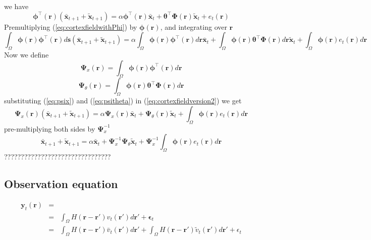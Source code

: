 \documentclass[onecolumn,draftcls]{IEEEtran}
\begin{document}
we have
\begin{equation}
 \boldsymbol \phi^{\top}(\mathbf r)(\bar{\mathbf x}_{t+1}+\tilde{\mathbf x}_{t+1})=\alpha \boldsymbol\phi^{\top}(\mathbf r)\bar{\mathbf x}_{t}+\boldsymbol \theta^{\top}\boldsymbol\Phi(\mathbf r)\tilde{\mathbf x}_t+e_t(\mathbf r)
\label{eq:cortexfieldwithPhi}
\end{equation}
Premultiplying (\ref{eq:cortexfieldwithPhi}) by $\boldsymbol\phi(\mathbf r) $, and integrating over $\mathbf r$
\begin{equation}
\int_{\Omega} \boldsymbol\phi(\mathbf r)\boldsymbol \phi^{\top}(\mathbf r)d\mathbf s(\bar{\mathbf x}_{t+1}+\tilde{\mathbf x}_{t+1})=\alpha\int_{\Omega} \boldsymbol\phi(\mathbf r)\boldsymbol \phi^{\top}(\mathbf r)d\mathbf r \bar{\mathbf x}_{t}+\int_{\Omega} \boldsymbol\phi(\mathbf r)\boldsymbol \theta^{\top}\boldsymbol\Phi(\mathbf r)d\mathbf r\tilde{\mathbf x}_t+\int_{\Omega} \boldsymbol\phi(\mathbf r)e_t(\mathbf r)d\mathbf r
\label{eq:cortexfieldversion2}
\end{equation}
Now we define
\begin{equation}
 \boldsymbol\Psi_x(\mathbf r)=\int_{\Omega}\boldsymbol\phi(\mathbf r)\boldsymbol\phi^{\top}(\mathbf r)d\mathbf r
\label{eq:psix}
\end{equation}
\begin{equation}
  \boldsymbol\Psi_{\theta}(\mathbf r)=\int_{\Omega} \boldsymbol\phi(\mathbf r)\boldsymbol \theta^{\top}\boldsymbol\Phi(\mathbf r)d\mathbf r
\label{eq:psitheta}
\end{equation}
substituting (\ref{eq:psix}) and (\ref{eq:psitheta}) in (\ref{eq:cortexfieldversion2}) we get
\begin{equation}
\boldsymbol\Psi_x(\mathbf r)(\bar{\mathbf x}_{t+1}+\tilde{\mathbf x}_{t+1})=\alpha\boldsymbol\Psi_x(\mathbf r) \bar{\mathbf x}_{t}+\boldsymbol\Psi_{\theta}(\mathbf r)\tilde{\mathbf x}_t+\int_{\Omega} \boldsymbol\phi(\mathbf r)e_t(\mathbf r)d\mathbf r
\end{equation}
pre-multiplying both sides by $\boldsymbol\Psi_x^{-1}$
\begin{equation}
\bar{\mathbf x}_{t+1}+\tilde{\mathbf x}_{t+1}=\alpha\bar{\mathbf x}_{t}+\boldsymbol\Psi_x^{-1}\boldsymbol\Psi_{\theta}\tilde{\mathbf x}_t+\boldsymbol\Psi_x^{-1}\int_{\Omega} \boldsymbol\phi(\mathbf r)e_t(\mathbf r)d\mathbf r
\end{equation}
????????????????????????????????
\subsection{Observation equation}
\begin{eqnarray}
 \mathbf y_t(\mathbf r)&=&\\
&=&\int_{\Omega}H(\mathbf r-\mathbf r')v_t(\mathbf r')d\mathbf r'+\boldsymbol\epsilon_t \\
&=&\int_{\Omega}H(\mathbf r-\mathbf r')\bar v_t(\mathbf r')d\mathbf r'+\int_{\Omega}H(\mathbf r-\mathbf r')\tilde v_t(\mathbf r')d\mathbf r'+\epsilon_t
\label{eq:observationequation}
\end{eqnarray}
\end{document}
